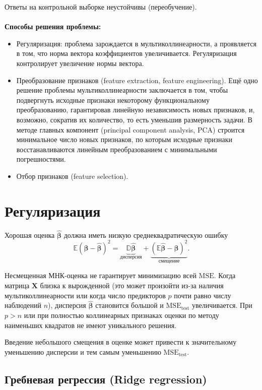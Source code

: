 \documentclass[12pt,a4paper,final]{article}
\newcommand{\betah}{\hat{\bm \beta}}
\newcommand{\betaa}{\bm{\beta}}
\newcommand{\1}{\mathds{1}}
\begin{document}
Ответы на контрольной выборке неустойчивы (переобучение).
\\
\\
\textbf{Способы решения проблемы:}
\begin{itemize}
	\item Регуляризация: проблема зарождается в мультиколлинеарности, а проявляется в том, что норма вектора коэффициентов увеличивается. Регуляризация контролирует увеличение нормы вектора.
	\item Преобразование признаков (feature extraction, feature engineering). Ещё одно решение проблемы мультиколлинеарности заключается в том, чтобы подвергнуть исходные признаки некоторому функциональному преобразованию, гарантировав линейную независимость новых признаков, и, возможно, сократив их	количество, то есть уменьшив размерность задачи. В методе главных компонент (principal component analysis, PCA) строится минимальное число новых признаков, по которым исходные признаки восстанавливаются линейным преобразованием с минимальными погрешностями.
	\item Отбор признаков (feature selection).
\end{itemize}



\section{Регуляризация}

Хорошая оценка $\betah$ должна иметь низкую среднеквадратическую ошибку 
\begin{equation*}
	\label{eq:mse}
	\mathbb{E}(\betaa - \betah)^2 = \underbrace{\mathbb D \betah}_{\text{дисперсия}} + \underbrace{(\mathbb E \betah - \betaa)^2}_{\text{смещение}}.
\end{equation*}

Несмещенная МНК-оценка не гарантирует минимизацию всей $\mathrm{MSE}$.
Когда матрица $\bm{X}$ близка к вырожденной (это может произойти из-за наличия мультиколлинеарности или когда число предикторов $p$ почти равно числу наблюдений $n$), дисперсия $\hat{\bm \beta}$ становится большой и $\mathrm{MSE}_{\mathrm{test}}$ увеличивается.  При $p>n$ или при полностью коллинеарных признаках оценки по методу наименьших квадратов не имеют уникального решения.

Введение небольшого смещения в оценке может привести к значительному уменьшению дисперсии и тем самым уменьшению $\mathrm{MSE}_{\text{test}}$.

\subsection{Гребневая регрессия (Ridge regression)}
\end{document}
